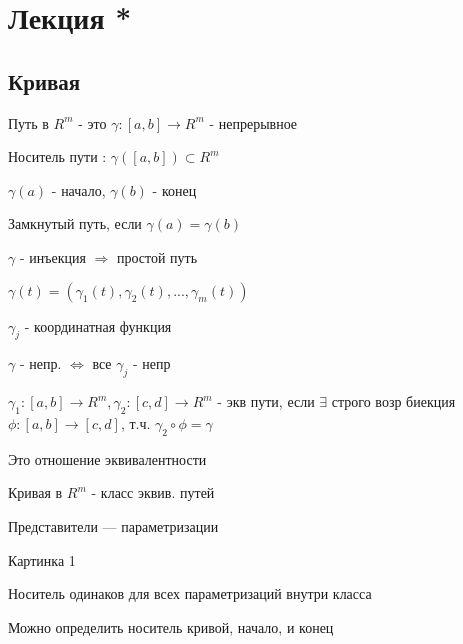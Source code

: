\newpage
\section{Лекция *}


\subsection{Кривая}

\begin{definition}

    Путь в $R^m$ - это $\gamma : [a, b] \to R^m$ - непрерывное

    Носитель пути  : $\gamma([a, b]) \subset R^m$

    $\gamma(a)$ - начало, $\gamma(b)$ - конец

    Замкнутый путь, если $\gamma(a) = \gamma(b)$

    $\gamma$ - инъекция $\Rightarrow$ простой путь

    $\gamma(t) = (\gamma_1(t), \gamma_2(t), ... , \gamma_m(t))$

    $\gamma_j$ - координатная функция

    $\gamma $ - непр. $\Longleftrightarrow$ все $\gamma_j$ - непр


\end{definition}


\begin{definition}
    $\gamma_1: [a, b] \to R^m, \gamma_2 : [c, d] \to R^m$ - экв пути, если
    $\exists$ строго возр биекция $\phi : [a, b] \to [c, d]$, т.ч.
    $\gamma_2 \circ \phi = \gamma$
\end{definition}

\begin{remark}
    Это отношение эквивалентности
\end{remark}

\begin{definition}
    Кривая в $R ^ m$ - класс эквив. путей

    Представители --- параметризации
\end{definition}

Картинка 1

\begin{remark}
    Носитель одинаков для всех параметризаций внутри класса
\end{remark}


\begin{remark}
    Можно определить носитель кривой, начало, и конец
\end{remark}



